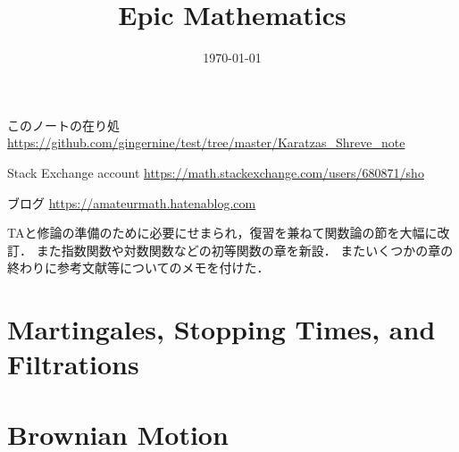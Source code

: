 \documentclass[a4j,10.5pt,oneside,openany]{jsbook}
\title{Epic Mathematics}
\date{\today}
\theoremstyle{mystyle}
\begin{document}
%
%
\maketitle
	このノートの在り処 \url{https://github.com/gingernine/test/tree/master/Karatzas_Shreve_note}

	Stack Exchange account \url{https://math.stackexchange.com/users/680871/sho}
	
	ブログ \url{https://amateurmath.hatenablog.com}
	
	TAと修論の準備のために必要にせまられ，復習を兼ねて関数論の節を大幅に改訂．
	また指数関数や対数関数などの初等関数の章を新設．
	またいくつかの章の終わりに参考文献等についてのメモを付けた．
	
	\begin{comment}
	関数論(のまだ入り口)は積分論的に展開していますがそれ自体は売りではなく
	(そもそも連続関数や正則関数ばかり出てくる関数論をわざわざ積分論の上に展開するメリットがあるのかと
	突っ込まれるかもしれませんが，決してメリットが無いわけではなく，
	むしろ煩雑な議論が軽減されて見通しが良いでしょう．
	それに僕のノートの流れではそうせざるを得ません)，
	RudinのReal and Complex Analysisにおいて既に試みられています．
	売りは，積分路の微分可能性を外して，つまり連続性と有界変動性のみを仮定した下で，
	関数論の特に和書にはあまり見られない回転数と指数の繋がりを精密に分析し，
	AhlforsやRudinの流儀の``スマートな論理展開''を実現し(かけ)ているところです．
	意義も難易度も取るに足らないことかもしれませんが，
	多くの本は$C^1$級の積分路しか扱わないか，或いはゴツくて分かりづらい
	(論理式に書き起こしにくい)のが僕にとっては難点でしたので，
	ようやく自己流に関数論を展開する準備が出来て安心しています．
	\\
	\\
	\end{comment}
	
%
%
%
\tableofcontents
\frontmatter
%
\mainmatter
%
\chapter{Martingales, Stopping Times, and Filtrations}








\chapter{Brownian Motion}








\end{document}
